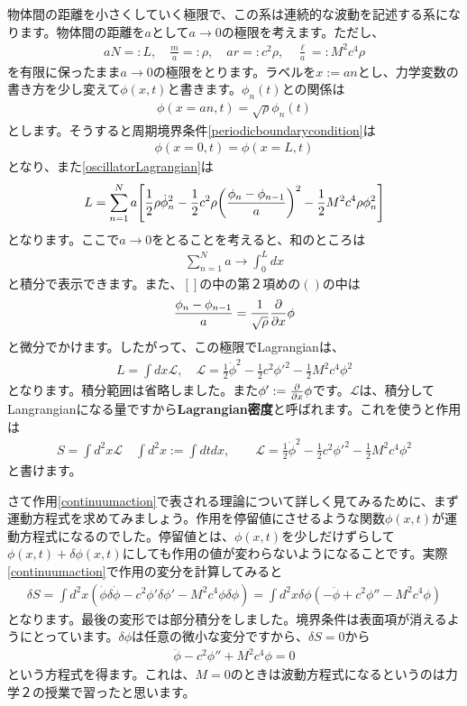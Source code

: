\documentclass[report,paper=a4, fontsize=12pt, line_length=16cm, number_of_lines=33,dvipdfmx]{jlreq}
\numberwithin{equation}{chapter}
\newcommand{\strong}[1]{{\sffamily \bfseries #1}}
\newcommand{\Lcal}{\mathcal{L}}
\begin{document}
物体間の距離を小さくしていく極限で、この系は連続的な波動を記述する系になります。物体間の距離を$a$として$a\to 0$の極限を考えます。ただし、
\begin{align}
  aN=:L,\quad \frac{m}{a}=:\rho,\quad ar=:c^2\rho,\quad \frac{\ell}{a}=:M^2c^4 \rho \label{classicalcontinuum}
\end{align}
を有限に保ったまま$a\to 0$の極限をとります。ラベルを$x:=an$とし、力学変数の書き方を少し変えて$\phi(x,t)$と書きます。$\phi_n(t)$との関係は
\begin{align}
  \phi(x=an,t)=\sqrt{\rho}\phi_n(t)
\end{align}
とします。そうすると周期境界条件\eqref{periodicboundarycondition}は
\begin{align}
  \phi(x=0,t)=\phi(x=L,t)
\end{align}
となり、また\eqref{oscillatorLagrangian}は
\begin{align}
  L=\sum_{n=1}^{N}a\qty[
    \frac12 \rho \dot{\phi}_n^2-\frac12 c^2\rho\qty(\frac{\phi_{n}-\phi_{n-1}}{a})^2-\frac12 M^2c^4 \rho \phi_n^2
  ]
\end{align}
となります。ここで$a\to 0$をとることを考えると、和のところは
\begin{align}
  \sum_{n=1}^{N}a\to\int_{0}^{L}dx
\end{align}
と積分で表示できます。また、$[]$の中の第２項めの$()$の中は
\begin{align}
  \frac{\phi_n-\phi_{n-1}}{a}=\frac{1}{\sqrt{\rho}}\pdv{x}\phi
\end{align}
と微分でかけます。したがって、この極限でLagrangianは、
\begin{align}
  L=\int dx \Lcal,\quad 
  \Lcal=
    \frac12 \dot{\phi}^2-\frac12 c^2 \phi'^2-\frac12 M^2 c^4 \phi^2
\end{align}
となります。積分範囲は省略しました。また$\phi':=\pdv{x}\phi$です。$\Lcal$は、積分してLangrangianになる量ですから\strong{Lagrangian密度}と呼ばれます。これを使うと作用は
\begin{align}
  S=\int d^2x \Lcal
  \quad \int d^2x :=\int dt dx,\qquad
  \Lcal=\frac12 \dot{\phi}^2-\frac12 c^2 \phi'^2-\frac12 M^2c^4 \phi^2\label{continuumaction}
\end{align}
と書けます。

さて作用\eqref{continuumaction}で表される理論について詳しく見てみるために、まず運動方程式を求めてみましょう。作用を停留値にさせるような関数$\phi(x,t)$が運動方程式になるのでした。停留値とは、$\phi(x,t)$を少しだけずらして$\phi(x,t)+\delta \phi(x,t)$にしても作用の値が変わらないようになることです。実際\eqref{continuumaction}で作用の変分を計算してみると
\begin{align}
  \delta S
  =\int d^2x( \dot{\phi}\delta\dot{\phi}-c^2\phi'\delta \phi'-M^2c^4\phi\delta \phi)
  =\int d^2x\delta \phi( -\ddot{\phi}+c^2\phi''-M^2c^4\phi)
\end{align}
となります。最後の変形では部分積分をしました。境界条件は表面項が消えるようにとっています。$\delta \phi$は任意の微小な変分ですから、$\delta S=0$から
\begin{align}
  \ddot{\phi}-c^2\phi''+M^2c^4\phi=0
  \label{eomKG2}
\end{align}
という方程式を得ます。これは、$M=0$のときは波動方程式になるというのは力学２の授業で習ったと思います。
\end{document}
